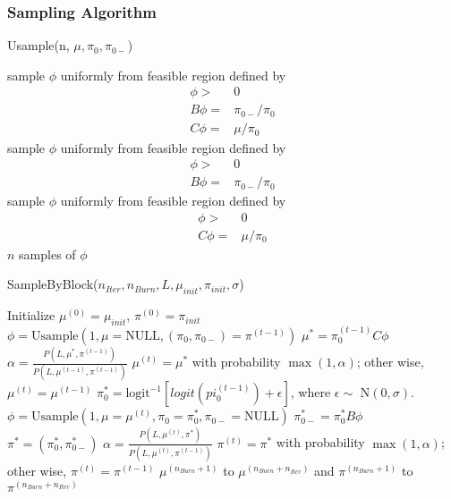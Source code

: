 \documentclass[11 pt, a4paper]{article}  %
\begin{document}
\newpage

\subsubsection{Sampling Algorithm}
\begin{algorithm}[H]
\caption{Usample(n, $\mu, \pi_0, \pi_{0-}$)}
\begin{algorithmic}[1]
\State sample $\phi$ uniformly from feasible region defined by 
\begin{align*}
\phi > & 0\\
B \phi = & \pi_{0-}/\pi_0\\ 
C \phi = & \mu/\pi_0
\end{align*}
\State sample $\phi$ uniformly from feasible region defined by 
\begin{align*}
\phi > & 0\\
B \phi = & \pi_{0-}/\pi_0
\end{align*}
\Else
\State sample $\phi$ uniformly from feasible region defined by 
\begin{align*}
\phi > & 0\\
C \phi = & \mu/\pi_0
\end{align*}
\EndIf
{} $n$ samples of $\phi$
\end{algorithmic}
\end{algorithm}


\begin{algorithm}[H]
\caption{SampleByBlock($n_{Iter}, n_{Burn}, L, \mu_{init}, \pi_{init}, \sigma$)}
\begin{algorithmic}[1]
\State Initialize $\mu^{(0)} = \mu_{init}$, $\pi^{(0)} = \pi_{init}$
\State $\phi = \text{Usample} (1, \mu=\text{NULL}, (\pi_0,\pi_{0-})=\pi^{(t-1)})$
\State $\mu^* = \pi_0^{(t-1)} C \phi $
\State $\alpha = \frac{P(L, \mu^*, \pi^{(t-1)} )}{P(L, \mu^{(t-1)}, \pi^{(t-1)} )}$
\State $\mu^{(t)} = \mu^*$ with probability $\max(1, \alpha)$; other wise, $\mu^{(t)} = \mu^{(t-1)}$
\State $\pi^*_{0} = \text{logit}^{-1}[logit(pi_{0}^{(t-1)}) + \epsilon]$, where $\epsilon \sim $ N$(0, \sigma)$.
\State $\phi = \text{Usample} (1, \mu=\mu^{(t)}, \pi_0=\pi^*_{0},\pi_{0-}=\text{NULL})$
\State $\pi^*_{0-} = \pi^*_{0} B \phi$
\State $\pi^* = (\pi^*_{0}, \pi^*_{0-})$
\State $\alpha = \frac{P(L, \mu^{(t)}, \pi^* )}{P(L, \mu^{(t)}, \pi^{(t-1)} )}$
\State $\pi^{(t)} = \pi^*$ with probability $\max(1, \alpha)$; other wise, $\pi^{(t)} = \pi^{(t-1)} $
\EndFor
{} $\mu^{(n_{Burn}+1)}$ to $\mu^{(n_{Burn} + n_{Iter})}$ and $\pi^{(n_{Burn}+1)}$ to $\pi^{(n_{Burn} + n_{Iter})}$
\end{algorithmic}
\end{algorithm}
\end{document}
